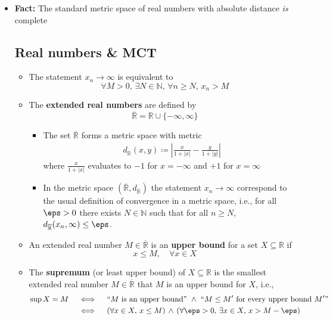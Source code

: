 \documentclass[11pt,twoside]{report}
\newcommand{\bbN}{{\mathbb{N}}}
\newcommand{\bbR}{{\mathbb{R}}}
\begin{document}
\begin{itemize}
\item \textbf{Fact:} The  standard metric space of real numbers with absolute distance  \emph{is} complete




\subsection{Real numbers \& MCT}

\begin{itemize}

\item The statement $x_n \to \infty$ is equivalent to  
\[
\forall M > 0, \, \exists N \in \bbN, \, \forall n \ge N, \, x_n  >  M 
\]

\item The \textbf{extended real numbers} are defined by
\[
\overline{\bbR} = \bbR \cup \{ -  \infty,  \infty\}
\]
\begin{itemize}
\item The set $\overline{\bbR}$ forms a metric  space with metric
\begin{align*}
d_{\overline{\bbR}}(x,y) \coloneqq \left | \frac{ x }{ 1 + |x|}  - \frac{ y}{ 1 + |y|} \right|
\end{align*}
where $\frac{x}{1+ |x|}$ evaluates to $-1$ for $x =  - \infty$ and $+1 $ for $x  =  \infty$


\item In the metric space $(\overline{\bbR}, d_{\overline{\bbR}})$ the statement $x_n \to \infty$ correspond to the usual definition of convergence in a metric space, i.e., for all $\eps > 0$ there exists $N \in \bbN$ such that for all $n \ge 
N$,  $d_{\overline{\bbR}}(x_n, \infty) \le \eps$. 

\end{itemize}


\item %
An extended real number $M \in \overline{\bbR}$  is an \textbf{upper bound} for a set $X \subseteq \bbR$ if 
\[
x \le M, \quad \forall x \in X
\]



\item The \textbf{supremum} (or least upper bound) of $X\subseteq \bbR$ is the 
 smallest extended real number $M \in \overline{\bbR}$ that $M$ is an upper bound for $X$, i.e., 
 \begin{align*}
 \sup X =  M \quad &  \iff 
 \quad \text{``$M$ is an upper bound'' }  \wedge  \text{ ``$M \le M'$ for every  upper bound $M'$''}\\
 & \iff  \quad    (\forall x \in X, \, x \le M) \,   \wedge \,  (\forall \eps > 0, \,  \exists x \in X,  \,  x > M - \eps)  
 \end{align*}
 

\end{itemize}
\end{itemize}
\end{document}
